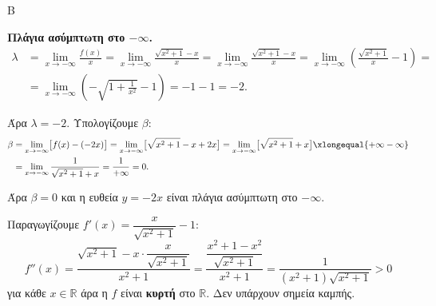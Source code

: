 \begin{thema}{Β}
\begin{erwthma}
\textbf{Πλάγια ασύμπτωτη στο $-\infty$.}
\begin{align*}
\lambda&=\lim_{x\to-\infty}\frac{f(x)}{x}=\lim_{x\to-\infty}\frac{\sqrt{x^2+1}-x}{x}=\lim\limits_{x\to-\infty}
\frac{\sqrt{x^2+1}-x}{x}=\lim_{x\to-\infty}\left( \frac{\sqrt{x^2+1}}{x}-1\right) =\\&=\lim_{x\to-\infty}\left( -\sqrt{1+\frac{1}{x^2}}-1\right)=-1-1=-2.
\end{align*}


Άρα $\lambda=-2$. Υπολογίζουμε $\beta$:
\begin{align*}
\beta&=\lim_{x\to-\infty}\bigl[f(x)-(-2x)\bigr]=\lim_{x\to-\infty}\bigl[\sqrt{x^2+1}-x+2x\bigr]=\lim_{x\to-\infty}\bigl[\sqrt{x^2+1}+x\bigr]\xlongequal{+\infty-\infty}\\
&=\lim\limits_{x\to-\infty}{\frac{1}{\sqrt{x^2+1}+x}}=\frac{1}{+\infty}=0.
\end{align*}




Άρα $\beta=0$ και η ευθεία $y=-2x$ είναι {πλάγια ασύμπτωτη} στο $-\infty$.

\item Παραγωγίζουμε $f'(x)=\dfrac{x}{\sqrt{x^2+1}}-1$:
\[
f''(x)=\frac{\sqrt{x^2+1}-x\cdot\dfrac{x}{\sqrt{x^2+1}}}{x^2+1}=\frac{\dfrac{x^2+1-x^2}{\sqrt{x^2+1}}}{x^2+1}=\frac{1}{(x^2+1)\sqrt{x^2+1}}>0
\]
για κάθε $x\in\mathbb{R}$ άρα η $f$ είναι \textbf{κυρτή} στο $\mathbb{R}$. Δεν υπάρχουν σημεία καμπής.

\end{erwthma}
\end{thema}


